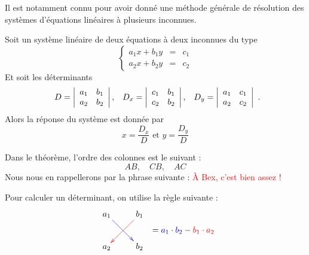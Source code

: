 Il est notamment connu pour avoir donné une méthode générale de résolution des systèmes d'équations linéaires à plusieurs inconnues.

\begin{theoreme}
Soit un système linéaire de deux équations à deux inconnues du type
$$
\left\{
\begin{array}{lcl}
a_1 x + b_1 y &=& c_1\\
a_2 x + b_2 y &=& c_2
\end{array}
\right.
$$
Et soit les déterminants 
$$
\begin{array}{lcr}
D = \left|\begin{array}{cc}
a_1 & b_1\\
a_2 & b_2
\end{array}\right|,
&
D_x = \left|\begin{array}{cc}
c_1 &b_1\\
c_2 & b_2
\end{array}\right|,
&
D_y = \left|\begin{array}{cc}
a_1 & c_1\\
a_2 & c_2
\end{array}\right|
\end{array}.
$$
Alors la réponse du système est donnée par
$$
x= \frac{D_x}{D} \mbox{ et } y = \frac{D_y}{D}
$$
\end{theoreme}

\begin{remarque}
Dans le théorème, l'ordre des colonnes est le suivant :
$$
AB,\quad CB,\quad AC
$$
Nous nous en rappellerons par la phrase suivante :
\textcolor{red}{À Bex, c'est bien assez !}
\end{remarque}

Pour calculer un déterminant, on utilise la règle suivante :
$$
\begin{array}{l}
\xymatrix{
a_1\ar@[blue][rd] & b_1\ar@[red][ld] \\
a_2 & b_2 }
\end{array}
= \textcolor{blue}{a_1 \cdot b_2} - \textcolor{red}{b_1 \cdot a_2}
$$

